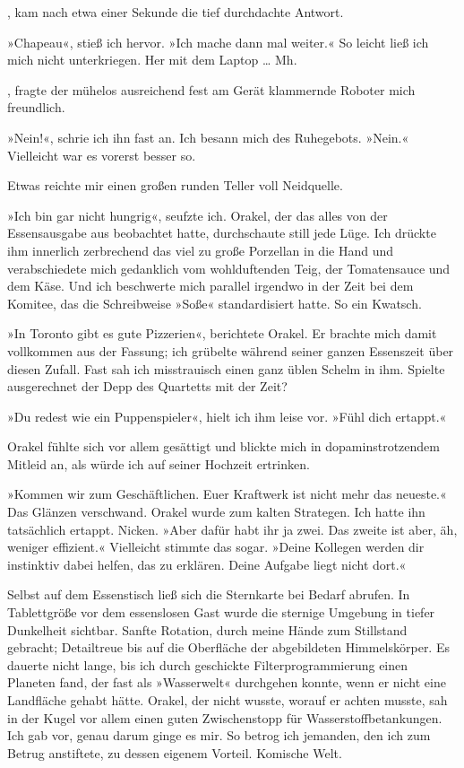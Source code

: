 , kam nach etwa einer Sekunde die tief durchdachte Antwort. 

»Chapeau«, stieß ich hervor. »Ich mache dann mal weiter.« So leicht ließ ich mich nicht unterkriegen. Her mit dem Laptop … Mh.

, fragte der mühelos ausreichend fest am Gerät klammernde Roboter mich freundlich.

»Nein!«, schrie ich ihn fast an. Ich besann mich des Ruhegebots. »Nein.« Vielleicht war es vorerst besser so.

 Etwas reichte mir einen großen runden Teller voll Neidquelle. 

»Ich bin gar nicht hungrig«, seufzte ich. Orakel, der das alles von der Essensausgabe aus beobachtet hatte, durchschaute still jede Lüge. Ich drückte ihm innerlich zerbrechend das viel zu große Porzellan in die Hand und verabschiedete mich gedanklich vom wohlduftenden Teig, der Tomatensauce und dem Käse. Und ich beschwerte mich parallel irgendwo in der Zeit bei dem Komitee, das die Schreibweise »Soße« standardisiert hatte. So ein Kwatsch.

»In Toronto gibt es gute Pizzerien«, berichtete Orakel. Er brachte mich damit vollkommen aus der Fassung; ich grübelte während seiner ganzen Essenszeit über diesen Zufall. Fast sah ich misstrauisch einen ganz üblen Schelm in ihm. Spielte ausgerechnet der Depp des Quartetts mit der Zeit?

»Du redest wie ein Puppenspieler«, hielt ich ihm leise vor. »Fühl dich ertappt.«

Orakel fühlte sich vor allem gesättigt und blickte mich in dopaminstrotzendem Mitleid an, als würde ich auf seiner Hochzeit ertrinken.

»Kommen wir zum Geschäftlichen. Euer Kraftwerk ist nicht mehr das neueste.« Das Glänzen verschwand. Orakel wurde zum kalten Strategen. Ich hatte ihn tatsächlich ertappt. Nicken. »Aber dafür habt ihr ja zwei. Das zweite ist aber, äh, weniger effizient.« Vielleicht stimmte das sogar. »Deine Kollegen werden dir instinktiv dabei helfen, das zu erklären. Deine Aufgabe liegt nicht dort.«

Selbst auf dem Essenstisch ließ sich die Sternkarte bei Bedarf abrufen. In Tablettgröße vor dem essenslosen Gast wurde die sternige Umgebung in tiefer Dunkelheit sichtbar. Sanfte Rotation, durch meine Hände zum Stillstand gebracht; Detailtreue bis auf die Oberfläche der abgebildeten Himmelskörper. Es dauerte nicht lange, bis ich durch geschickte Filterprogrammierung einen Planeten fand, der fast als »Wasserwelt« durchgehen konnte, wenn er nicht eine Landfläche gehabt hätte. Orakel, der nicht wusste, worauf er achten musste, sah in der Kugel vor allem einen guten Zwischenstopp für Wasserstoffbetankungen. Ich gab vor, genau darum ginge es mir. So betrog ich jemanden, den ich zum Betrug anstiftete, zu dessen eigenem Vorteil. Komische Welt.

